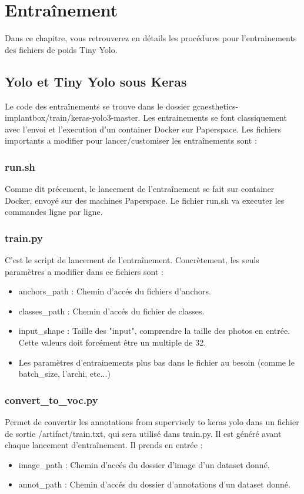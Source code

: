 \chapter{Entraînement}

Dans ce chapitre, vous retrouverez en détails les procédures pour l'entrainements des fichiers de poids Tiny Yolo.

\section{Yolo et Tiny Yolo sous Keras}

Le code des entraînements se trouve dans le dossier gcaesthetics-implantbox/train/keras-yolo3-master.
Les entrainements se font classiquement avec l'envoi et l'execution d'un container Docker sur Paperspace.
Les fichiers importants a modifier pour lancer/customiser les entraînements sont :

\subsection{run.sh}
Comme dit précement, le lancement de l'entraînement se fait sur container Docker, envoyé sur des machines Paperspace.
Le fichier run.sh va executer les commandes ligne par ligne.

\subsection{train.py}
C'est le script de lancement de l'entraînement.
Concrètement, les seuls paramètres a modifier dans ce fichiers sont :
\begin{itemize}
    \item anchors_path : Chemin d'accés du fichiers d'anchors.
    \item classes_path : Chemin d'accés du fichier de classes.
    \item input_shape : Taille des "input", comprendre la taille des photos en entrée. Cette valeurs doit forcément être un multiple de 32.
    \item Les paramètres d'entrainements plus bas dans le fichier au besoin (comme le batch_size, l'archi, etc...)
\end{itemize}

\subsection{convert_to_voc.py}
Permet de convertir les annotations from supervisely to keras yolo dans un fichier de sortie /artifact/train.txt, qui sera utilisé dans train.py.
Il est généré avant chaque lancement d'entraînement.
Il prends en entrée :
\begin{itemize}
    \item image_path : Chemin d'accés du dossier d'image d'un dataset donné.
    \item annot_path : Chemin d'accés du dossier d'annotations d'un dataset donné.
\end{itemize}

